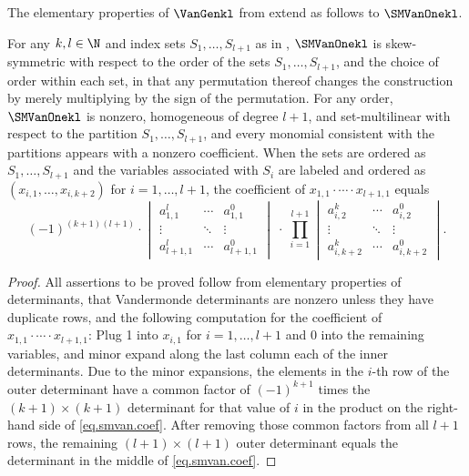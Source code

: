 The elementary properties of $\VanGenkl$ from  extend as follows to $\SMVanOnekl$.
\begin{proposition}
  \label{prop.smvan1-basic}
  For any \(k,l\in \N\) and index sets \(S_1,\ldots,S_{l+1}\) as in , 
  \(\SMVanOnekl\) is skew-symmetric with respect to the order of the sets
  \(S_1,\ldots,S_{l+1}\), and the choice of order within each set, in that any permutation thereof changes the construction by merely multiplying by the sign of the permutation. For any order,
  \(\SMVanOnekl\) is nonzero, homogeneous of degree
  \(l+1\), and set-multilinear with respect to the partition \(S_1, \dots, S_{l+1}\), and
  every monomial consistent with the partitions appears with a nonzero coefficient.
  When the sets are ordered as \(S_1,\ldots,S_{l+1}\)
  and the variables associated with $S_i$ are labeled and ordered as
  \((x_{i,1},\ldots,x_{i,k+2})\) for \(i=1,\ldots,l+1\),
  the coefficient of \(x_{1,1}\cdot\cdots\cdot x_{l+1,1}\)
  equals
  \begin{equation}\label{eq.smvan.coef} 
  (-1)^{(k+1)(l+1)} \cdot 
    \begin{vmatrix*}
      a_{1,1}^l & \cdots & a_{1,1}^0 \\
      \vdots & \ddots & \vdots \\
      a_{l+1,1}^l & \cdots & a_{l+1,1}^0
    \end{vmatrix*}
    \;\cdot\;
    \prod_{i=1}^{l+1}
      \begin{vmatrix*}
        a_{i,2}^k & \cdots & a_{i,2}^0 \\
        \vdots & \ddots & \vdots \\
        a_{i,k+2}^k & \cdots & a_{i,k+2}^0
      \end{vmatrix*}.
  \end{equation}
\end{proposition}
\begin{proof}
  All assertions to be proved follow from elementary properties of
  determinants, that Vandermonde determinants are nonzero unless they
  have duplicate rows, and the following computation for the coefficient of \(x_{1,1}\cdot\cdots\cdot x_{l+1,1}\):
  Plug 1 into \(x_{i,1}\) for \(i=1,\ldots,l+1\) and 0 into the
  remaining variables, and minor expand along the last column each of the inner determinants. Due to the minor expansions, the elements in the $i$-th row of the outer determinant have a common factor of $(-1)^{k+1}$ times the $(k+1) \times (k+1)$ determinant for that value of $i$ in the product on the right-hand side of \eqref{eq.smvan.coef}. After removing those common factors from all $l+1$ rows, the remaining $(l+1) \times (l+1)$ outer determinant equals the determinant in the middle of \eqref{eq.smvan.coef}.
\end{proof}

